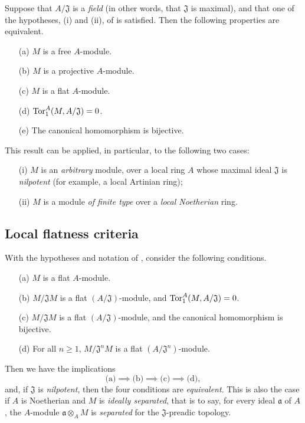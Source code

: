 \begin{env}[10.1.3]
\label{0.10.1.3}
Suppose that $A/\mathfrak{J}$ is a \emph{field} (in other words, that $\mathfrak{J}$ is maximal), and that one of the hypotheses, (i) and (ii), of  is satisfied.
Then the following properties are equivalent.
\begin{enumerate}
  \item[(a)] $M$ is a free $A$-module.
  \item[(b)] $M$ is a projective $A$-module.
  \item[(c)] $M$ is a flat $A$-module.
  \item[(d)] $\operatorname{Tor}_1^A(M,A/\mathfrak{J})=0$.
  \item[(e)] The canonical homomorphism  is bijective.
\end{enumerate}

This result can be applied, in particular, to the following two cases:
\begin{enumerate}
  \item[(i)] $M$ is an \emph{arbitrary} module, over a local ring $A$ whose maximal ideal $\mathfrak{J}$ is \emph{nilpotent} (for example, a local Artinian ring);
  \item[(ii)] $M$ is a module \emph{of finite type} over a \emph{local Noetherian} ring.
\end{enumerate}
\end{env}

\subsection{Local flatness criteria}
\label{subsection:0.10.2}

\begin{env}[10.2.1]
\label{0.10.2.1}
With the hypotheses and notation of , consider the following conditions.
\begin{enumerate}
  \item[(a)] $M$ is a flat $A$-module.
  \item[(b)] $M/\mathfrak{J}M$ is a flat $(A/\mathfrak{J})$-module, and $\operatorname{Tor}_1^A(M,A/\mathfrak{J})=0$.
  \item[(c)] $M/\mathfrak{J}M$ is a flat $(A/\mathfrak{J})$-module, and the canonical homomorphism  is bijective.
  \item[(d)] For all $n\geq1$, $M/\mathfrak{J}^nM$ is a flat $(A/\mathfrak{J}^n)$-module.
\end{enumerate}

Then we have the implications
\[
  \text{(a)}\implies\text{(b)}\implies\text{(c)}\implies\text{(d)},
\]
and, if $\mathfrak{J}$ is \emph{nilpotent}, then the four conditions are \emph{equivalent}.
This is also the case if $A$ is Noetherian and $M$ is \emph{ideally separated}, that is to say, for every ideal $\mathfrak{a}$ of $A$, the $A$-module $\mathfrak{a}\otimes_A M$ is \emph{separated} for the $\mathfrak{J}$-preadic topology.
\end{env}

